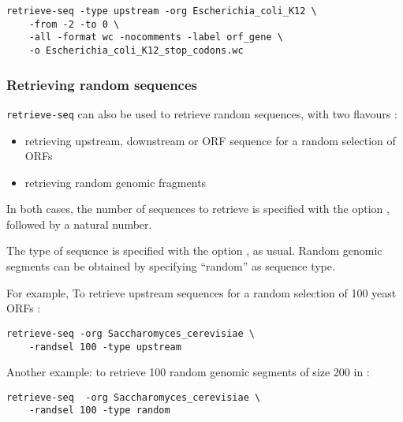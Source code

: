\begin{verbatim}
retrieve-seq -type upstream -org Escherichia_coli_K12 \
    -from -2 -to 0 \
    -all -format wc -nocomments -label orf_gene \
    -o Escherichia_coli_K12_stop_codons.wc
\end{verbatim}

\subsubsection{Retrieving random sequences}

\texttt{retrieve-seq} can also be used to retrieve random sequences,
with two flavours :

\begin{itemize}
\item retrieving upstream, downstream or ORF sequence for a random
selection of ORFs
\item retrieving random genomic fragments
\end{itemize}

In both cases, the number of sequences to retrieve is specified with
the option , followed by a natural number.

The type of sequence is specified with the option \option{-type}, as
usual. Random genomic segments can be obtained by specifying
``random'' as sequence type.

For example, To retrieve upstream sequences for a random selection of
100 yeast ORFs :
\begin{verbatim}
retrieve-seq -org Saccharomyces_cerevisiae \
    -randsel 100 -type upstream
\end{verbatim}

Another example: to retrieve 100 random genomic segments of size 200
in  :
\begin{verbatim}
retrieve-seq  -org Saccharomyces_cerevisiae \
    -randsel 100 -type random
\end{verbatim}


